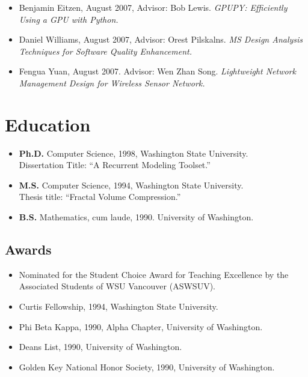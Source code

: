 \documentclass[10pt]{article}
\begin{document}
\begin{itemize}
  \item Benjamin Eitzen,  August 2007, Advisor: Bob Lewis. {\em GPUPY: Efficiently Using a 
    GPU with Python.}
  \item Daniel Williams, August 2007,  Advisor: Orest Pilskalns. {\em MS Design 
    Analysis Techniques for Software Quality Enhancement.}
  \item Fengua Yuan, August 2007. Advisor: Wen Zhan Song. {\em Lightweight Network Management 
     Design for Wireless Sensor Network.}
\end{itemize}


\section*{Education}

\begin{itemize}
\item {\bf Ph.D.} Computer Science, 1998,
Washington State University. \\
Dissertation Title: ``A Recurrent Modeling Toolset.''

\item {\bf M.S.} Computer Science, 1994,
Washington State University. \\
Thesis title: ``Fractal Volume Compression.''

\item {\bf B.S.} Mathematics, cum laude, 1990.
University of Washington. 
\end{itemize}

\subsection*{Awards}

\begin{itemize}
\item Nominated for the Student Choice Award for Teaching
  Excellence by the Associated Students of WSU Vancouver (ASWSUV).
\item Curtis Fellowship, 1994, Washington State University.
\item Phi Beta Kappa, 1990, Alpha Chapter, University of Washington.
\item Deans List, 1990, University of Washington.
\item Golden Key National Honor Society, 1990, University of Washington.
\end{itemize}
\end{document}
